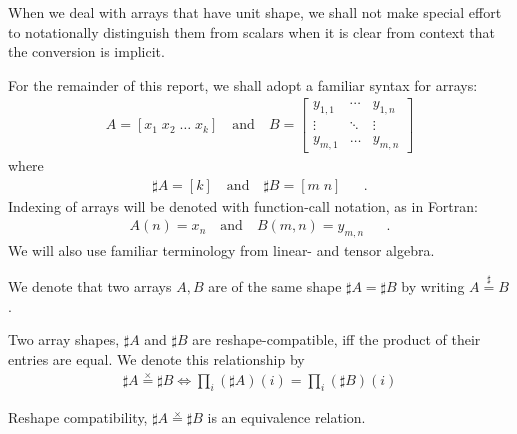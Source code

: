 \documentclass{DIKU-report}
\newcommand\sharpeq{\stackrel{\sharp}{=}}
\newcommand\prodeq{\stackrel{\times}{=}}
\begin{document}
\begin{remark}
  \label{rem:scalar}
  When we deal with arrays that have unit shape, we shall not make special effort
  to notationally distinguish them from scalars when it is clear from context that
  the conversion is implicit.
\end{remark}

\begin{example}
  \label{ex:syntax}
  For the remainder of this report, we shall adopt a familiar syntax for arrays:
  \begin{align*}
    A = [ x_1\; x_2\; \dots \; x_k ] \quad \text{and} \quad
    B = \begin{bmatrix}
      y_{1,1} & \cdots & y_{1,n} \\
      \vdots & \ddots & \vdots \\
      y_{m,1} & \dots  & y_{m,n} 
    \end{bmatrix}
  \end{align*}
  where
  \begin{align*}
    \sharp A = [k] \quad \text{and} \quad \sharp B = [ m\; n ] && .
  \end{align*}
  Indexing of arrays will be denoted with function-call notation, as in Fortran:
  \begin{align*}
    A(n) = x_n \quad \text{and} \quad B(m,n) = y_{m,n} && .
  \end{align*}
  We will also use familiar terminology from linear- and tensor algebra.
\end{example}

\begin{definition}
  \label{def:sheq} 
  We denote that two arrays \(A, B\) are of the same shape \(\sharp A = \sharp B\)
  by writing \(A \sharpeq B\).
\end{definition}

\begin{definition}
  \label{def:reshape-comp} 
  Two array shapes, \(\sharp A\) and \(\sharp B\) are reshape-compatible, iff the product
  of their entries are equal. We denote this relationship by 
  \begin{align*}
    \sharp A \prodeq \sharp B \iff
    \prod_{i} (\sharp A)(i) = \prod_{i} (\sharp B)(i)
  \end{align*}
\end{definition}

\begin{theorem}
  \label{the:reshape-comp-eq}
  Reshape compatibility, \(\sharp A \prodeq \sharp B\) is an equivalence relation. 
\end{theorem}
\end{document}
